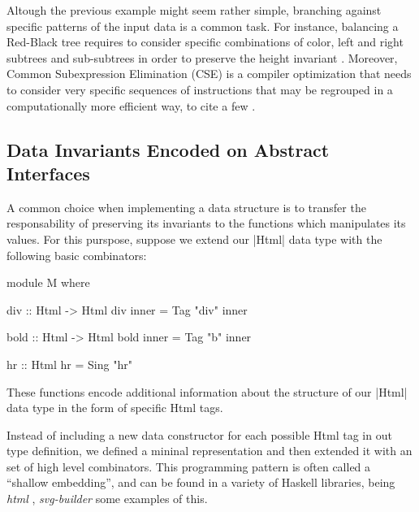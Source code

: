

Altough the previous example might seem rather simple, branching against
specific patterns of the input data is a common task.
%
For instance, balancing a Red-Black tree requires to consider specific
combinations of color, left and right subtrees and sub-subtrees in order to
preserve the height invariant \tocite.
%
Moreover, Common Subexpression Elimination (CSE) is a compiler optimization that
needs to consider very specific sequences of instructions that may be regrouped
in a computationally more efficient way, to cite a few \tocite.



\subsection*{\textbf{Data Invariants Encoded on Abstract Interfaces}}

A common choice when implementing a data structure is to transfer the
responsability of preserving its invariants to the functions which manipulates
its values.
%
For this purspose, suppose we extend our |Html| data type with the following
basic combinators:
%
\begin{code}
module M where

  div :: Html -> Html
  div inner = Tag "div" inner

  bold :: Html -> Html
  bold inner = Tag "b" inner

  hr :: Html
  hr = Sing "hr"
\end{code}
%
%
These functions encode additional information about the structure of our |Html|
data type in the form of specific Html tags.


Instead of including a new data constructor for each possible Html tag in out
type definition, we defined a mininal representation and then extended it with
an set of high level combinators.
%
%
This programming pattern is often called a ``shallow embedding'', and can be
found in a variety of Haskell libraries, being \emph{html} \tocite,
\emph{svg-builder} \tocite some examples of this.


